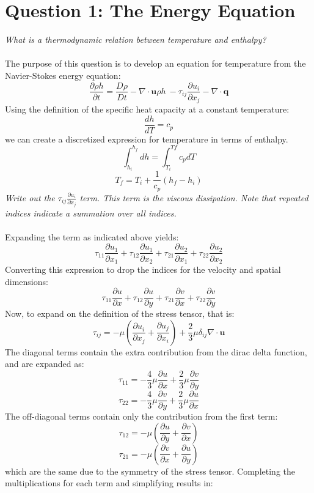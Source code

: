\documentclass{article}
\begin{document}
\section{Question 1: The Energy Equation}\label{sec:Q4}
\textit{What is a thermodynamic relation between temperature and enthalpy?} \\ \\
The purpose of this question is to develop an equation for temperature from the Navier-Stokes energy equation: \\
$$\frac{\partial \rho h}{\partial t} =\frac{D\rho }{Dt} -\nabla \cdot \textbf{u}\rho h\  -\tau_{ij} \frac{\partial u_{i}}{\partial x_{j}} -\nabla \cdot \textbf{q}$$
Using the definition of the specific heat capacity at a constant temperature:
$$\frac{dh}{dT} =c_{p}$$
we can create a discretized expression for temperature in terms of enthalpy.
$$\int^{h_{f}}_{h_{i}} dh=\int^{Tf}_{T_{i}} c_{p}dT$$
$$T_{f}=T_{i}+\frac{1}{c_{p}} (h_{f}-h_{i})$$
\textit{Write out the $\tau_{ij} \frac{\partial u_{i}}{\partial x_{j}}$ term. This term is the viscous dissipation. Note that repeated indices indicate a summation over all indices.}\\ \\
Expanding the term as indicated above yields:
$$\tau_{11} \frac{\partial u_{1}}{\partial x_{1}} +\tau_{12} \frac{\partial u_{1}}{\partial x_{2}} +\tau_{21} \frac{\partial u_{2}}{\partial x_{1}} +\tau_{22} \frac{\partial u_{2}}{\partial x_{2}} $$
Converting this expression to drop the indices for the velocity and spatial dimensions:
$$\tau_{11} \frac{\partial u}{\partial x} +\tau_{12} \frac{\partial u}{\partial y} +\tau_{21} \frac{\partial v}{\partial x} +\tau_{22} \frac{\partial v}{\partial y} $$
Now, to expand on the definition of the stress tensor, that is:
$$\tau_{ij} =-\mu \left( \frac{\partial u_{i}}{\partial x_{j}} +\frac{\partial u_{j}}{\partial x_{i}} \right)  +\frac{2}{3} \mu \delta_{ij} \nabla \cdot \textbf{u}$$
The diagonal terms contain the extra contribution from the dirac delta function, and are expanded as:
$$\tau_{11} =-\frac{4}{3} \mu \frac{\partial u}{\partial x} +\frac{2}{3} \mu \frac{\partial v}{\partial y} $$
$$\tau_{22} =-\frac{4}{3} \mu \frac{\partial v}{\partial y} +\frac{2}{3} \mu \frac{\partial u}{\partial x} $$
The off-diagonal terms contain only the contribution from the first term:
$$\tau_{12} =-\mu \left( \frac{\partial u}{\partial y} +\frac{\partial v}{\partial x} \right) $$ 
$$\tau_{21} =-\mu \left( \frac{\partial v}{\partial x} +\frac{\partial u}{\partial y} \right)  $$
which are the same due to the symmetry of the stress tensor. Completing the multiplications for each term and simplifying results in:
\end{document}
